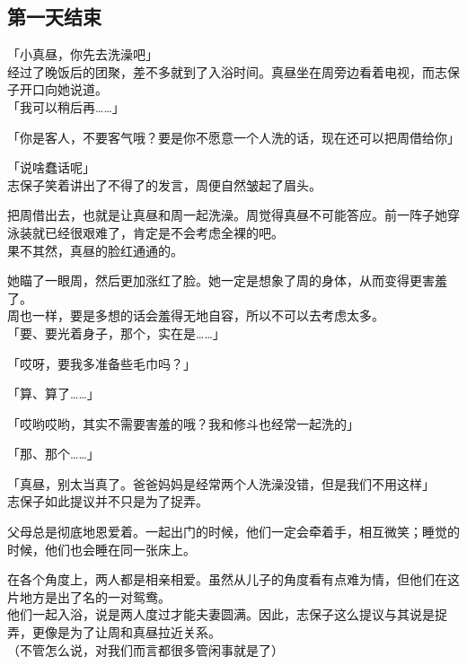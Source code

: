 \subsection{第一天结束}

「小真昼，你先去洗澡吧」\\

经过了晚饭后的团聚，差不多就到了入浴时间。真昼坐在周旁边看着电视，而志保子开口向她说道。\\

「我可以稍后再……」

「你是客人，不要客气哦？要是你不愿意一个人洗的话，现在还可以把周借给你」

「说啥蠢话呢」\\

志保子笑着讲出了不得了的发言，周便自然皱起了眉头。

把周借出去，也就是让真昼和周一起洗澡。周觉得真昼不可能答应。前一阵子她穿泳装就已经很艰难了，肯定是不会考虑全裸的吧。\\

果不其然，真昼的脸红通通的。

她瞄了一眼周，然后更加涨红了脸。她一定是想象了周的身体，从而变得更害羞了。\\

周也一样，要是多想的话会羞得无地自容，所以不可以去考虑太多。\\

「要、要光着身子，那个，实在是……」

「哎呀，要我多准备些毛巾吗？」

「算、算了……」

「哎哟哎哟，其实不需要害羞的哦？我和修斗也经常一起洗的」

「那、那个……」

「真昼，别太当真了。爸爸妈妈是经常两个人洗澡没错，但是我们不用这样」\\

志保子如此提议并不只是为了捉弄。

父母总是彻底地恩爱着。一起出门的时候，他们一定会牵着手，相互微笑；睡觉的时候，他们也会睡在同一张床上。

在各个角度上，两人都是相亲相爱。虽然从儿子的角度看有点难为情，但他们在这片地方是出了名的一对鸳鸯。\\

他们一起入浴，说是两人度过才能夫妻圆满。因此，志保子这么提议与其说是捉弄，更像是为了让周和真昼拉近关系。\\

（不管怎么说，对我们而言都很多管闲事就是了）\\

